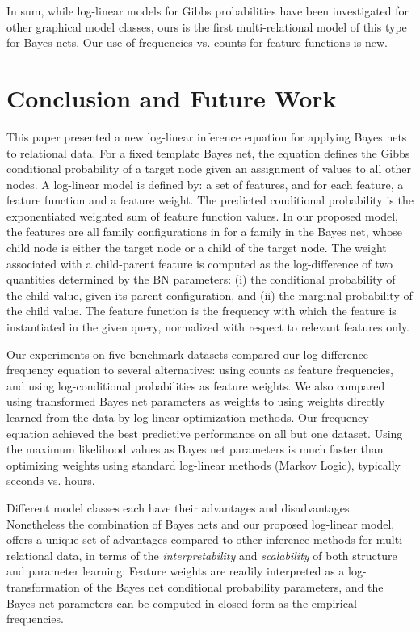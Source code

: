 \documentclass[twoside,11pt]{article}
\begin{document}
In sum, while log-linear models for Gibbs probabilities have been investigated for other graphical model classes, ours is the first multi-relational model of this type for Bayes nets. Our use of frequencies vs. counts for feature functions is new. 


\section{Conclusion and Future Work} 
\label{sec:conclusion}

This paper presented a new log-linear inference equation for applying Bayes nets to relational data. For a fixed template Bayes net, the equation defines the Gibbs conditional probability of a target node given an assignment of values to all other nodes. A log-linear model is defined by: a set of features, and for each feature, a feature function and a feature weight. The predicted conditional probability is the exponentiated weighted sum of feature function values. In our proposed model, the features are all family configurations in for a family in the Bayes net, whose child node is either the target node or a child of the target node. The weight associated with a child-parent feature is computed as the log-difference of two quantities determined by the BN parameters: (i) the conditional probability of the child value, given its parent configuration, and (ii) the marginal probability of the child value. The feature function is the frequency with which the feature is instantiated in the given query, normalized with respect to relevant features only. 

Our experiments on five benchmark datasets compared our log-difference frequency equation to several alternatives: using counts as feature frequencies, and  using log-conditional probabilities as feature weights. We also compared using transformed Bayes net parameters as weights to using weights directly learned from the data by log-linear optimization methods. Our frequency equation achieved the best predictive performance on all but one dataset. Using the maximum likelihood values as Bayes net parameters is much faster than optimizing weights using standard log-linear methods (Markov Logic), typically seconds vs. hours. 

Different model classes each have their advantages and disadvantages. Nonetheless  the combination of Bayes nets and  our proposed log-linear model,  offers a unique set of advantages compared to other inference methods for multi-relational data, in terms of the  \emph{interpretability} and \emph{scalability} of both structure and parameter learning: Feature weights are readily interpreted as a log-transformation of the Bayes net conditional probability parameters, and the Bayes net parameters can be computed in closed-form as the empirical frequencies. 
\end{document}

